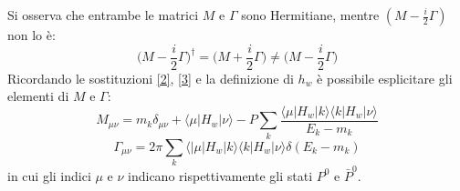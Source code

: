 Si osserva che entrambe le matrici $M$ e $\Gamma$ sono Hermitiane, mentre $(M-\frac{i}{2}\Gamma)$ non lo è:
\begin{equation}
 \Bigg(M-\frac{i}{2}\Gamma\Bigg)^{\dag} = \Bigg(M +\frac{i}{2}\Gamma\Bigg) \neq \Bigg(M-\frac{i}{2}\Gamma\Bigg)
\end{equation}
Ricordando le sostituzioni \eqref{2}, \eqref{3} e la definizione di $h_w$ è possibile esplicitare gli elementi di $M$ e $\Gamma$:
\begin{equation}
M_{\mu\nu} = m_k\delta_{\mu\nu} + \langle \mu|H_w|\nu\rangle - P\sum_{k}\frac{\langle\mu|H_w|k\rangle\langle k|H_w|\nu\rangle}{E_k-m_k}
\end{equation}
\begin{equation}\label{gamma}
\Gamma_{\mu\nu} = 2\pi\sum_{k}\langle|\mu|H_w|k\rangle\langle k|H_w|\nu\rangle\delta(E_k-m_k) 
\end{equation}
in cui gli indici $\mu$ e $\nu$ indicano rispettivamente gli stati $P^0$ e $\bar{P}^0$.

